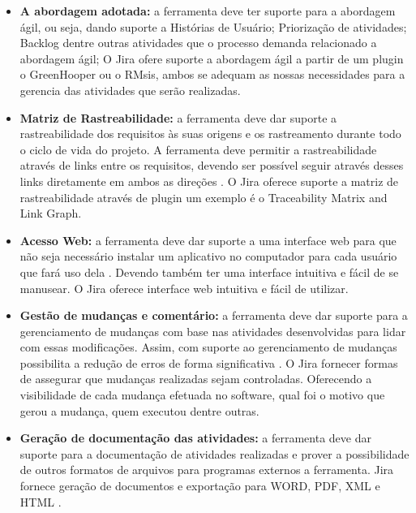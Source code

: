 \begin{itemize}
    \item \textbf{A abordagem adotada:} a ferramenta deve ter suporte para a abordagem ágil, ou seja, dando suporte a Histórias de Usuário; Priorização de atividades; Backlog dentre outras atividades que o processo demanda relacionado a abordagem ágil; O Jira ofere suporte a abordagem ágil a partir de um plugin o GreenHooper ou o RMsis, ambos se adequam as nossas necessidades para a gerencia das atividades que serão realizadas. 
    \item \textbf{Matriz de Rastreabilidade:} a ferramenta deve dar suporte a rastreabilidade dos requisitos às suas origens e os rastreamento durante todo o ciclo de vida do projeto. A ferramenta deve permitir a rastreabilidade através de links entre os requisitos, devendo ser possível seguir através desses links diretamente em ambos as direções \cite{hoffmann2004}. O Jira oferece suporte a matriz de rastreabilidade através de plugin um exemplo é o Traceability Matrix and Link Graph.
    \item \textbf{Acesso Web:} a ferramenta deve dar suporte a uma interface web para que não seja necessário instalar um aplicativo no computador para cada usuário que fará uso dela \cite{hoffmann2004}. Devendo também ter uma interface intuitiva e fácil de se manusear. O Jira oferece interface web intuitiva e fácil de utilizar.
    \item \textbf{Gestão de mudanças e comentário:} a ferramenta deve dar suporte para a gerenciamento de mudanças com base nas atividades desenvolvidas para lidar com essas modificações. Assim, com suporte ao gerenciamento de mudanças possibilita a redução de erros de forma significativa \cite{hoffmann2004}. O Jira fornecer formas de assegurar que mudanças realizadas sejam controladas. Oferecendo a visibilidade de cada mudança efetuada no software, qual foi o motivo que gerou a mudança, quem executou dentre outras.
    \item \textbf{Geração de documentação das atividades:} a ferramenta deve dar suporte para a documentação de atividades realizadas e  prover a possibilidade de outros formatos de arquivos para programas externos a ferramenta.  Jira fornece geração de documentos e exportação para WORD, PDF, XML e HTML \cite{jira2016}.
\end{itemize}


